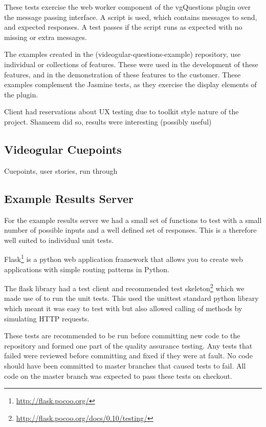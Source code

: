 These tests exercise the web worker component of the vgQuestions plugin over the message passing interface. A script is used, which contains messages to send, and expected responses. A test passes if the script runs as expected with no missing or extra messages.

The examples created in the (videogular-questions-example) repository, use individual or collections of features. These were used in the development of these features, and in the demonstration of these features to the customer.  These examples complement the Jasmine tests, as they exercise the display elements of the plugin.

Client had reservations about UX testing due to toolkit style nature of the project. Shameem did so, results were interesting (possibly useful)

\subsection{Videogular Cuepoints}
\label{Subsection:Videogular Cuepoints in example}
Cuepoints, user stories, run through

\subsection{Example Results Server}
\label{Subsection:Example Results Server in example}
For the example results server we had a small set of functions to test with a small number of possible inputs and a well defined set of responses. This is a therefore well suited to individual unit tests.

Flask\footnote{\url{http://flask.pocoo.org/}} is a python web application framework that allows you to create web applications with simple routing patterns in Python.

The flask library had a test client and recommended test skeleton\footnote{\url{http://flask.pocoo.org/docs/0.10/testing/}} which we made use of to run the unit tests. This used the unittest standard python library which meant it was easy to test with but also allowed calling of methods by simulating HTTP requests.

These tests are recommended to be run before committing new code to the repository and formed one part of the quality assurance testing. Any tests that failed were reviewed before committing and fixed if they were at fault. No code should have been committed to master branches that caused tests to fail. All code on the master branch was expected to pass these tests on checkout.

